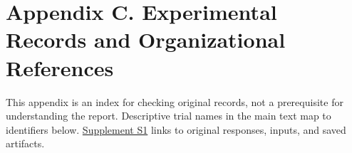 \documentclass[10pt,a4paper]{article}
\newlength{\usable}
\begin{document}
\section{Appendix C. Experimental Records and Organizational References}\label{two-role-failure-design-appendix-c.-experimental-records-and-organizational-references}

This appendix is an index for checking original records, not a prerequisite for understanding the report. Descriptive trial names in the main text map to identifiers below. \href{https://github.com/metaSATOKEN/MRSI/blob/9443de315d283874df0c27e0e99b8c04f400709d/papers/two-role-failure-design/evidence-index-en-v0.3-2026-10-13.md}{Supplement S1} links to original responses, inputs, and saved artifacts.

\Needspace{115pt}
\begingroup\fontsize{9.1}{12}\selectfont\setlength{\parskip}{1pt}
\setlength{\usable}{\dimexpr\linewidth-6\tabcolsep\relax}
\end{document}
